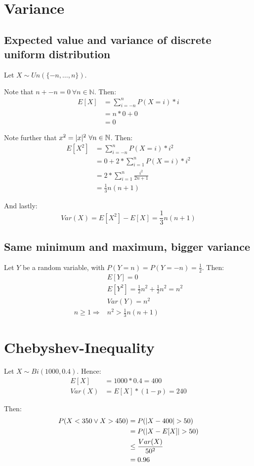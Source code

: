 \documentclass[a4paper]{scrreprt}
\DeclarePairedDelimiter\abs{\lvert}{\rvert}
\begin{document}
\section{Variance}

\subsection{Expected value and variance of discrete uniform distribution}

Let $X \sim Un(\{-n, \ldots, n\})$.

Note that $n + -n = 0\ \forall n \in \mathbb{N}$. Then:
\begin{align*}
	E[X] & = \sum_{i=-n}^n{P(X=i) * i} \\
	& = n * 0 + 0 \\
	& = 0
\end{align*}

Note further that $x^2 = \abs{x}^2\ \forall n \in \mathbb{N}$. Then:
\begin{align*}
	E[X^2] & = \sum_{i=-n}^n{P(X = i) * i^2} \\
	& = 0 + 2 * \sum_{i=1}^n{P(X = i) * i^2} \\
	& = 2 * \sum_{i=1}^n{\frac{i^2}{2n + 1}} \\
	& = \frac{1}{3} n (n + 1)
\end{align*}

And lastly:
\[
	Var(X) = E[X^2] - E[X] = \frac{1}{3} n (n+1)
\]

\subsection{Same minimum and maximum, bigger variance}

Let $Y$ be a random variable, with $P(Y = n) = P(Y = -n) = \frac{1}{2}$. Then:
\begin{align*}
	& E[Y] = 0 \\
	& E[Y^2] = \frac{1}{2} n^2 + \frac{1}{2} n^2 = n^2 \\
	& Var(Y) = n^2 \\
	n \geq 1 \Rightarrow & n^2 > \frac{1}{3} n (n + 1)
\end{align*}

\section{Chebyshev-Inequality}

Let $X \sim Bi(1000, 0.4)$. Hence:
\begin{align*}
	E[X] & = 1000 * 0.4 = 400 \\
	Var(X) & = E[X] * (1-p) = 240
\end{align*}

Then:
\begin{align*}
	P(X < 350 \lor X > 450) & = P(\abs{X - 400} > 50) \\
				& = P(\abs{X - E[X]} > 50) \\
	   & \leq \frac{Var(X)}{50^2} \\
	   & = 0.96
\end{align*}
\end{document}
